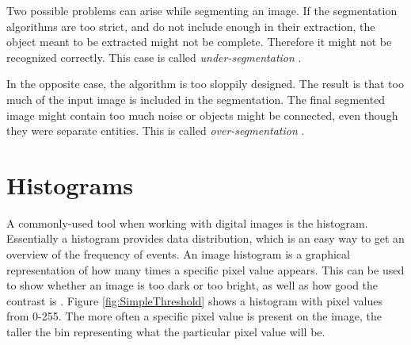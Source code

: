 Two possible problems can arise while segmenting an image. If the segmentation algorithms are too strict, and do not include enough in their extraction, the object meant to be extracted might not be complete. Therefore it might not be recognized correctly. This case is called \textit{under-segmentation} \citep{ip_book}.

In the opposite case, the algorithm is too sloppily designed. The result is that too much of the input image is included in the segmentation. The final segmented image might contain too much noise or objects might be connected, even though they were separate entities. This is called \textit{over-segmentation} \citep{ip_book}.

\section{Histograms}
A commonly-used tool when working with digital images is the histogram. Essentially a histogram provides data distribution, which is an easy way to get an overview of the frequency of events. An image histogram is a graphical representation of how many times a specific pixel value appears. This can be used to show whether an image is too dark or too bright, as well as how good the contrast is \citep{ip_book}. Figure \ref{fig:SimpleThreshold} shows a histogram with pixel values from 0-255. The more often a specific pixel value is present on the image, the taller the bin representing what the particular pixel value will be.

